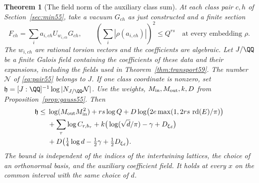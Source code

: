 \documentclass[a4paper,11pt]{article}
\newtheorem{theorem}[proposition]{Theorem}
\theoremstyle{definition}
\theoremstyle{remark}
\numberwithin{equation}{section}
\begin{document}
\begin{theorem}[The field norm of the auxiliary class sum]\label{thm:arch59}
At each class pair \(c,h\) of Section~\ref{sec:min55}, take a
vacuum \(G_{ch}\) as just constructed and a finite section
\[
      F_{ch}=\sum_i a_{i,ch}U_{w_{i,ch}}G_{ch},\qquad
      \left(\sum_i|\rho(a_{i,ch})|\right)^2\le Q^{rs}
                         \quad\text{at every embedding }\rho .
\]
The \(w_{i,ch}\) are rational torsion vectors and the coefficients
are algebraic. Let \(J/\QQ\) be a finite Galois field containing
the coefficients of these data and their expansions, including
the fields used in Theorem~\ref{thm:transport59}. The number
\(\mathcal N\) of \eqref{eq:pair55} belongs to \(J\). If one
class coordinate is nonzero, set
\(\mathfrak h=[J:\QQ]^{-1}\log|N_{J/\QQ}\mathcal N|\).
Use the weights, \(M_{\rm in},M_{\rm out},k,D\)
from Proposition~\ref{prop:gauss55}. Then
\begin{align}
 \mathfrak h\le {}&
     \log(M_{\rm out}M_{\rm in}^2)+rs\log Q
              +D\log\!\big(2e\max(1,2rs\,\operatorname{rd}(E)/\pi)\big)
                      \notag\\
    &+\sum_{\tau}\log C_{r,b_\tau}
       +k\big(\log(\sqrt d/\pi)-\gamma+D_{\xi_d}\big) \notag\\
    &+D\big(\tfrac14\log d-\tfrac12\gamma+\tfrac12D_{\xi_d}\big).
                                                        \label{eq:field59}
\end{align}
The bound is independent of the indices of the intertwining
lattices, the choice of an orthonormal basis, and the auxiliary
coefficient field. It holds at every \(x\) on the common
interval with the same choice of \(d\).
\end{theorem}
\end{document}
